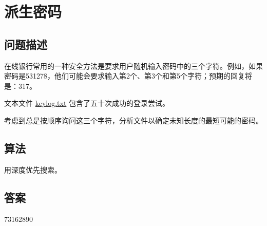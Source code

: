 \section{派生密码}\label{sec:problem79}
\subsection{问题描述}
\begin{tcolorbox}
在线银行常用的一种安全方法是要求用户随机输入密码中的三个字符。例如，如果密码是531278，他们可能会要求输入第2个、第3个和第5个字符；预期的回复将是：317。

文本文件 \href{https://projecteuler.net/resources/documents/0079_keylog.txt}{keylog.txt} 包含了五十次成功的登录尝试。

考虑到总是按顺序询问这三个字符，分析文件以确定未知长度的最短可能的密码。

\end{tcolorbox}

\subsection{算法}
用深度优先搜索。

\subsection{答案}
73162890
